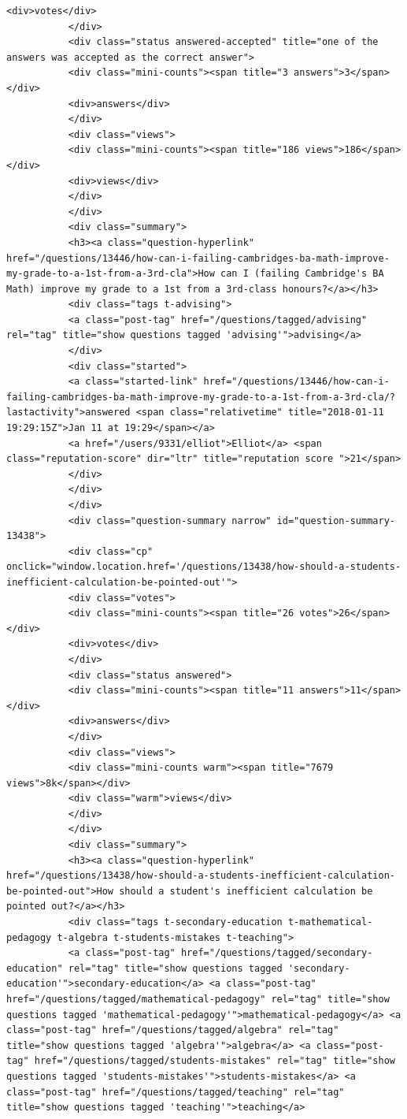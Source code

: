 \documentclass[11pt]{article}
\begin{document}
\begin{Verbatim}[commandchars=\\\{\}]
           <div>votes</div>
           </div>
           <div class="status answered-accepted" title="one of the answers was accepted as the correct answer">
           <div class="mini-counts"><span title="3 answers">3</span></div>
           <div>answers</div>
           </div>
           <div class="views">
           <div class="mini-counts"><span title="186 views">186</span></div>
           <div>views</div>
           </div>
           </div>
           <div class="summary">
           <h3><a class="question-hyperlink" href="/questions/13446/how-can-i-failing-cambridges-ba-math-improve-my-grade-to-a-1st-from-a-3rd-cla">How can I (failing Cambridge's BA Math) improve my grade to a 1st from a 3rd-class honours?</a></h3>
           <div class="tags t-advising">
           <a class="post-tag" href="/questions/tagged/advising" rel="tag" title="show questions tagged 'advising'">advising</a>
           </div>
           <div class="started">
           <a class="started-link" href="/questions/13446/how-can-i-failing-cambridges-ba-math-improve-my-grade-to-a-1st-from-a-3rd-cla/?lastactivity">answered <span class="relativetime" title="2018-01-11 19:29:15Z">Jan 11 at 19:29</span></a>
           <a href="/users/9331/elliot">Elliot</a> <span class="reputation-score" dir="ltr" title="reputation score ">21</span>
           </div>
           </div>
           </div>
           <div class="question-summary narrow" id="question-summary-13438">
           <div class="cp" onclick="window.location.href='/questions/13438/how-should-a-students-inefficient-calculation-be-pointed-out'">
           <div class="votes">
           <div class="mini-counts"><span title="26 votes">26</span></div>
           <div>votes</div>
           </div>
           <div class="status answered">
           <div class="mini-counts"><span title="11 answers">11</span></div>
           <div>answers</div>
           </div>
           <div class="views">
           <div class="mini-counts warm"><span title="7679 views">8k</span></div>
           <div class="warm">views</div>
           </div>
           </div>
           <div class="summary">
           <h3><a class="question-hyperlink" href="/questions/13438/how-should-a-students-inefficient-calculation-be-pointed-out">How should a student's inefficient calculation be pointed out?</a></h3>
           <div class="tags t-secondary-education t-mathematical-pedagogy t-algebra t-students-mistakes t-teaching">
           <a class="post-tag" href="/questions/tagged/secondary-education" rel="tag" title="show questions tagged 'secondary-education'">secondary-education</a> <a class="post-tag" href="/questions/tagged/mathematical-pedagogy" rel="tag" title="show questions tagged 'mathematical-pedagogy'">mathematical-pedagogy</a> <a class="post-tag" href="/questions/tagged/algebra" rel="tag" title="show questions tagged 'algebra'">algebra</a> <a class="post-tag" href="/questions/tagged/students-mistakes" rel="tag" title="show questions tagged 'students-mistakes'">students-mistakes</a> <a class="post-tag" href="/questions/tagged/teaching" rel="tag" title="show questions tagged 'teaching'">teaching</a>

\end{Verbatim}
\end{document}

